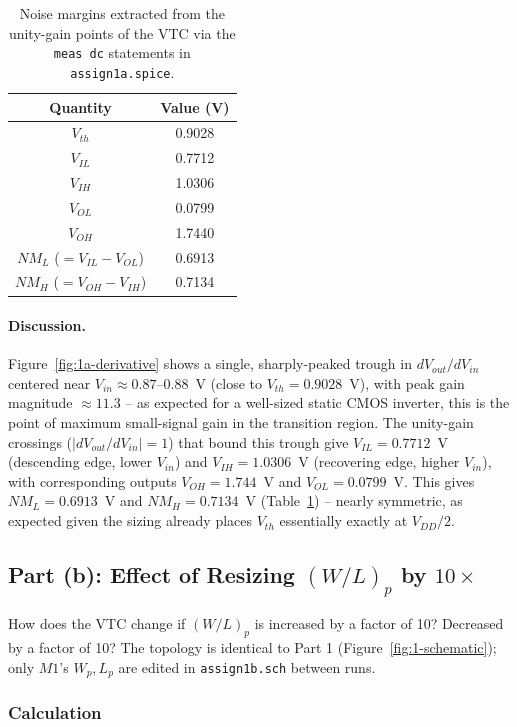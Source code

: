 \begin{table}[h]
  \centering
  \begin{tabular}{|c|c|}
    \hline
    Quantity & Value (V) \\
    \hline
    $V_{th}$ & 0.9028 \\
    $V_{IL}$ & 0.7712 \\
    $V_{IH}$ & 1.0306 \\
    $V_{OL}$ & 0.0799 \\
    $V_{OH}$ & 1.7440 \\
    $NM_L$ ($=V_{IL}-V_{OL}$)  & 0.6913 \\
    $NM_H$ ($=V_{OH}-V_{IH}$)  & 0.7134 \\
    \hline
  \end{tabular}
  \caption{Noise margins extracted from the unity-gain points of the VTC via the
  \texttt{meas dc} statements in \texttt{assign1a.spice}.}
  \label{tab:1a-nm}
\end{table}

\paragraph{Discussion.} Figure~\ref{fig:1a-derivative} shows a single,
sharply-peaked trough in $dV_{out}/dV_{in}$ centered near
$V_{in}\approx0.87$--$0.88$~V (close to $V_{th}=0.9028$~V), with peak gain
magnitude $\approx11.3$ -- as expected for a well-sized static CMOS inverter,
this is the point of maximum small-signal gain in the transition region. The
unity-gain crossings ($|dV_{out}/dV_{in}|=1$) that bound this trough give
$V_{IL}=0.7712$~V (descending edge, lower $V_{in}$) and $V_{IH}=1.0306$~V
(recovering edge, higher $V_{in}$), with corresponding outputs $V_{OH}=1.744$~V
and $V_{OL}=0.0799$~V. This gives $NM_L = 0.6913$~V and $NM_H = 0.7134$~V
(Table~\ref{tab:1a-nm}) -- nearly symmetric, as expected given the sizing
already places $V_{th}$ essentially exactly at $V_{DD}/2$.

\subsection{Part (b): Effect of Resizing $(W/L)_p$ by $10\times$}

How does the VTC change if $(W/L)_p$ is increased by a factor of 10? Decreased
by a factor of 10? The topology is identical to Part 1
(Figure~\ref{fig:1-schematic}); only $M1$'s $W_p, L_p$ are edited in
\texttt{assign1b.sch} between runs.

\subsubsection{Calculation}

